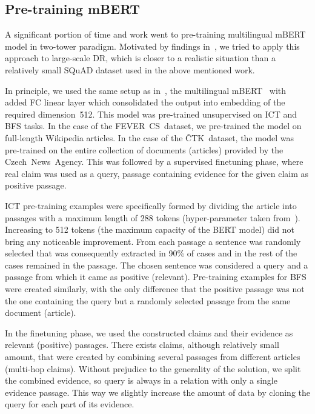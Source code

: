 \subsection{Pre-training mBERT}
\label{sub:prop-pretrained}
    A significant portion of time and work went to pre-training multilingual mBERT model in two-tower paradigm. Motivated by findings in~\parencite{chang2020twotower}, we tried to apply this approach to large-scale DR, which is closer to a realistic situation than a relatively small SQuAD dataset used in the above mentioned work.

    In principle, we used the same setup as in~\parencite{chang2020twotower}, the multilingual mBERT~\parencite{devlin2018bert} with added FC linear layer which consolidated the output into embedding of the required dimension~512. This model was pre-trained unsupervised on ICT and BFS tasks. In the case of the FEVER~CS~dataset, we pre-trained the model on full-length Wikipedia articles. In the case of the ČTK~dataset, the model was pre-trained on the entire collection of documents (articles) provided by the Czech~News~Agency. This was followed by a supervised finetuning phase, where real claim was used as a query, passage containing evidence for the given claim as positive passage. 
    
    ICT pre-training examples were specifically formed by dividing the article into passages with a maximum length of 288 tokens (hyper-parameter taken from~\parencite{Lee_2019_ict}). Increasing to 512 tokens (the maximum capacity of the BERT model) did not bring any noticeable improvement.  From each passage a sentence was randomly selected that was consequently extracted in 90\% of cases and in the rest of the cases remained in the passage. The chosen sentence was considered a query and a passage from which it came as positive (relevant). Pre-training examples for BFS were created similarly, with the only difference that the positive passage was not the one containing the query but a randomly selected passage from the same document (article).
    
    In the finetuning phase, we used the constructed claims and their evidence as relevant (positive) passages. There exists claims, although relatively small amount, that were created by combining several passages from different articles (multi-hop claims). Without prejudice to the generality of the solution, we split the combined evidence, so query is always in a relation with only a single evidence passage. This way we slightly increase the amount of data by cloning the query for each part of its evidence.
    
